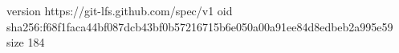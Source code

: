 version https://git-lfs.github.com/spec/v1
oid sha256:f68f1faca44bf087dcb43bf0b57216715b6e050a00a91ee84d8edbeb2a995e59
size 184
